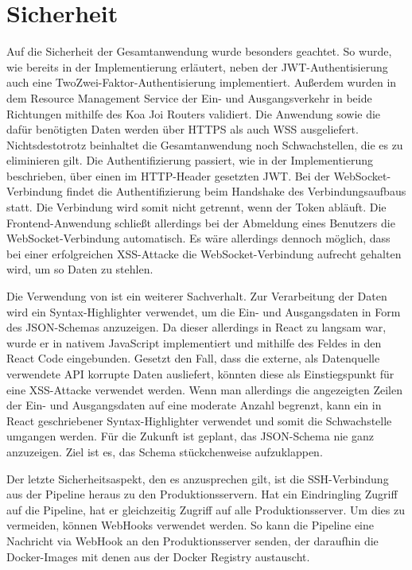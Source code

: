 \section{Sicherheit}
\label{sec:sicherheit}
Auf die Sicherheit der Gesamtanwendung wurde besonders geachtet. So
wurde, wie bereits in der Implementierung erläutert, neben
der JWT\hyp{}Authentisierung auch eine TwoZwei\hyp{}Faktor\hyp{}Authentisierung
implementiert. Außerdem wurden in dem Resource Management Service
der Ein- und Ausgangsverkehr in beide Richtungen mithilfe des Koa Joi Routers validiert. Die Anwendung sowie die dafür benötigten
Daten werden über HTTPS als auch WSS ausgeliefert. \mbox{Nichtsdestotrotz} beinhaltet die Gesamtanwendung
noch Schwachstellen, die es zu eliminieren gilt. Die Authentifizierung passiert, wie in der Implementierung beschrieben,
über einen im HTTP-Header gesetzten JWT. Bei der WebSocket-Verbindung findet die Authentifizierung beim Handshake des
Verbindungsaufbaus statt. Die Verbindung wird somit nicht getrennt, wenn der Token abläuft. Die Frontend-Anwendung
schließt allerdings bei der Abmeldung eines Benutzers die WebSocket-Verbindung automatisch. Es wäre allerdings dennoch möglich,
dass bei einer erfolgreichen XSS\hyp{}Attacke die WebSocket\hyp{}Verbindung aufrecht gehalten wird, um so Daten zu stehlen.

Die Verwendung von  ist ein weiterer Sachverhalt. Zur Verarbeitung
der Daten wird ein Syntax-Highlighter verwendet, um die Ein- und
Ausgangsdaten in Form des JSON-Schemas anzuzeigen.
Da dieser allerdings in React zu langsam war, wurde er
in nativem JavaScript implementiert und mithilfe des 
 Feldes in den React Code eingebunden. Gesetzt den Fall, dass die externe,
als Datenquelle verwendete API korrupte Daten ausliefert, könnten diese als Einstiegspunkt für eine XSS-Attacke verwendet werden.
Wenn man allerdings die angezeigten Zeilen der Ein- und Ausgangsdaten auf eine moderate Anzahl begrenzt, kann ein
in React geschriebener Syntax-Highlighter verwendet und somit die Schwachstelle umgangen werden. Für die Zukunft ist geplant,
das JSON-Schema nie ganz anzuzeigen. Ziel ist es, das Schema stückchenweise aufzuklappen.

Der letzte Sicherheitsaspekt, den es anzusprechen gilt, ist die SSH-Verbindung aus der Pipeline heraus zu den Produktionsservern.
Hat ein Eindringling Zugriff auf die Pipeline, hat er gleichzeitig Zugriff auf alle Produktionsserver. 
Um dies zu vermeiden, können WebHooks verwendet werden. So kann die Pipeline eine Nachricht via WebHook an
den Produktionsserver senden, der daraufhin die Docker-Images mit denen aus der Docker Registry austauscht.

